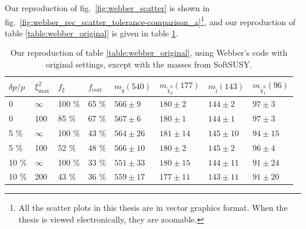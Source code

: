 \documentclass[twoside,english]{uiofysmaster}
\begin{document}
Our reproduction of fig.\ \ref{fig:webber_scatter} is shown in fig.\ \ref{fig:webber_rec_scatter_tolerance-comparison_a}\footnote{All the scatter plots in this thesis are in vector graphics format. When the thesis is viewed electronically, they are zoomable.}, and our reproduction of table \ref{table:webber_original} is given in table \ref{table:webber_softsusy}.
\begin{table}[hbt]
	\centering
	\begin{tabular}{| l | l | l | l  || l | l | l | l |}
		\hline
		$\delta p/p$ & $\xi^2_\mathrm{max}$ & $f_\xi$ & $f_\mathrm{corr}$ & $m_{\tilde q} (540)$ & $m_{\tilde \chi_2^0} (177)$ & $m_{\tilde l} (143)$ & $m_{\tilde \chi_1^0} (96)$ \\
		\hline \hline
		0 & 	$\infty$ &	100 \%	& 65 \%	& $566 \pm 9$	&	$180 \pm 2$		&	$144 \pm 2$	& 	$97 \pm 3$	\\
		0 &		100 &		85 \%	& 67 \% & $567 \pm 6$	&	$180 \pm 1$		&	$144 \pm 1$	&	$97 \pm 3$	\\
		5 \% &	$\infty$ &	100 \%	& 43 \% & $564 \pm 26$	& 	$181 \pm 14$	&	$145 \pm 10$&	$94 \pm 15$ \\
		5 \% &	100 &		52 \%	& 48 \% & $566 \pm 10$	&	$180 \pm 2$		& 	$145 \pm 2$	&	$96 \pm 4$	\\
		10 \% &	$\infty$ &	100 \%	& 33 \% & $551 \pm 33$	&	$180 \pm 15$	&	$144 \pm 11$&	$91 \pm 24$	\\
			10 \% &	200 &		43 \%	& 36 \% & $559 \pm 17$	& 	$177 \pm 11$	&	$143 \pm 11$&	$91 \pm 20$ \\
		\hline
	\end{tabular}
	\caption{Our reproduction of table \ref{table:webber_original}, using Webber's code \cite{Webber:epost} with original settings, except with the masses from SoftSUSY.}
	\label{table:webber_softsusy}
\end{table}
\end{document}
